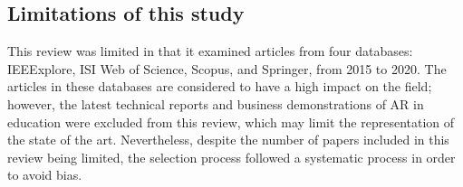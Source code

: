 \subsection{Limitations of this study}
This review was limited in that it examined articles from four databases: IEEExplore, ISI Web of Science, Scopus, and Springer, from 2015 to 2020. The articles in these databases are considered to have a high impact on the field; however, the latest technical reports and business demonstrations of AR in education were excluded from this review, which may limit the representation of the state of the art. Nevertheless, despite the number of papers included in this review being limited, the selection process followed a systematic process in order to avoid bias.
